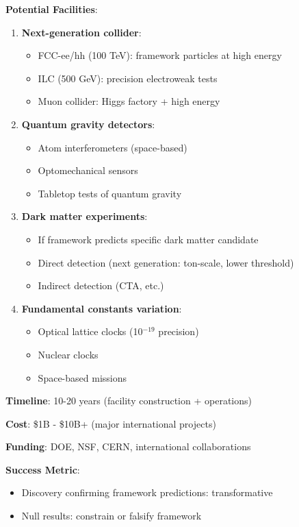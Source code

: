 \textbf{Potential Facilities}:

\begin{enumerate}
    \item \textbf{Next-generation collider}:
    \begin{itemize}
        \item FCC-ee/hh (100 TeV): framework particles at high energy
        \item ILC (500 GeV): precision electroweak tests
        \item Muon collider: Higgs factory + high energy
    \end{itemize}

    \item \textbf{Quantum gravity detectors}:
    \begin{itemize}
        \item Atom interferometers (space-based)
        \item Optomechanical sensors
        \item Tabletop tests of quantum gravity
    \end{itemize}

    \item \textbf{Dark matter experiments}:
    \begin{itemize}
        \item If framework predicts specific dark matter candidate
        \item Direct detection (next generation: ton-scale, lower threshold)
        \item Indirect detection (CTA, etc.)
    \end{itemize}

    \item \textbf{Fundamental constants variation}:
    \begin{itemize}
        \item Optical lattice clocks (10$^{-19}$ precision)
        \item Nuclear clocks
        \item Space-based missions
    \end{itemize}
\end{enumerate}

\textbf{Timeline}: 10-20 years (facility construction + operations)

\textbf{Cost}: \$1B - \$10B+ (major international projects)

\textbf{Funding}: DOE, NSF, CERN, international collaborations

\textbf{Success Metric}:
\begin{itemize}
    \item Discovery confirming framework predictions: transformative
    \item Null results: constrain or falsify framework
\end{itemize}

